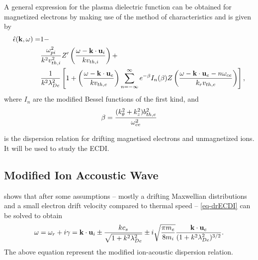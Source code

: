   \vspace{1em}
  A general expression for the plasma dielectric function can be obtained for magnetized electrons by making use of the method of characteristics and is given by
  \begin{equation} \label{eq-drECDI}
    \begin{split}
    \hat\epsilon({\mathbf k},\omega) =& 1 - \\
     &\frac{\omega_{pi}^2}{k^2 v^2_{th, i}} Z'\left( \frac{\omega - {\mathbf k} \cdot {\mathbf u_{i}}}{k v_{th, i}}  \right) + \\
     & \frac{1}{k^2 \lambda_{De}^2} \left[ 1 + \left(  \frac{\omega - {\mathbf k} \cdot {\mathbf u_{e}}}{k v_{th, e}} \right) \sum_{n=-\infty}^{\infty} e^{- \beta} I_n(\beta) Z\left(  \frac{\omega - {\mathbf k} \cdot {\mathbf u_{e} - n \ensuremath{\omega_{ce}}}}{k_{r} v_{th, e}} \right)  \right],
  \end{split}
  \end{equation}
  where $I_n$ are the modified Bessel functions of the first kind, and 
  \begin{equation} \label{eq-beta}
    \beta = \frac{(k_{\theta}^2 + k_z^2) b^2_{th, e}}{ \omega_{ce}^2}
  \end{equation}
  
   is the dispersion relation for drifting magnetised electrons and unmagnetized ions.
  It will be used to study the \acf{ECDI}.
  


  \subsection{Modified Ion Accoustic Wave}
  \label{sucsec-IAW}
  \citet{lafleur2016} shows that after some assumptions -- mostly a drifting Maxwellian distributions and a small electron drift velocity compared to thermal speed -- \cref{eq-drECDI} can be solved to obtain
  \begin{equation} \label{eq-MIAW}
    \omega = \omega_r + i \gamma = {\mathbf k} \cdot {\mathbf u_{i}} \pm \frac{k c_s}{\sqrt{1 + k^2 \lambda_{De}^2}} \pm i \sqrt{\frac{\pi m_e}{8 m_i}} \frac{{\mathbf k} \cdot {\mathbf u_{e}}}{( 1 + k^2 \lambda_{De}^2)^{3/2}}.
  \end{equation}
  The above equation represent the modified ion-acoustic dispersion relation.
  
